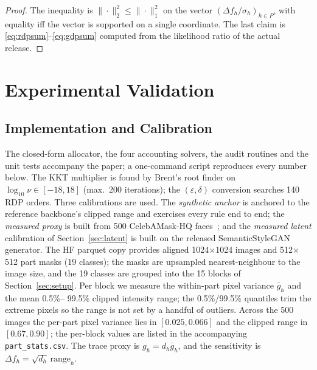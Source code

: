 \documentclass[10pt,twocolumn,letterpaper]{article}
\theoremstyle{plain}
\theoremstyle{definition}
\begin{document}
\begin{proof}
The inequality is $\|\cdot\|_2^2\le\|\cdot\|_1^2$ on the vector
$(\Delta f_h/\sigma_h)_{h\in P}$, with equality iff the vector is supported on
a single coordinate. The last claim is \eqref{eq:rdpsum}--\eqref{eq:gdpsum}
computed from the likelihood ratio of the actual release.
\end{proof}



\section{Experimental Validation}
\label{sec:experiments}

\subsection{Implementation and Calibration}

The closed-form allocator, the four accounting solvers, the audit routines and
the unit tests accompany the paper; a one-command script reproduces every
number below. The KKT multiplier is found by Brent's root finder on $\log_{10}\nu\in[-18,18]$
(max.\ 200 iterations); the $(\varepsilon,\delta)$ conversion searches 140 RDP orders.
Three calibrations are used. The \emph{synthetic anchor} is anchored to the
reference backbone's clipped range and exercises every rule end to end; the
\emph{measured proxy} is built from 500 CelebAMask-HQ faces~\cite{celebamaskhq};
and the \emph{measured latent} calibration of Section~\ref{sec:latent} is built
on the released SemanticStyleGAN generator. The HF parquet
copy provides aligned 1024$\times$1024 images and 512$\times$512 part masks
(19 classes); the masks are upsampled nearest-neighbour to the image size, and
the 19 classes are grouped into the 15 blocks of Section~\ref{sec:setup}. Per
block we measure the within-part pixel variance $\bar g_h$ and the mean 0.5\%--
99.5\% clipped intensity range; the 0.5\%/99.5\% quantiles trim the extreme
pixels so the range is not set by a handful of outliers. Across the 500 images
the per-part pixel variance lies in $[0.025,0.066]$ and the clipped range in
$[0.67,0.90]$; the per-block values are listed in the accompanying
\texttt{part\_stats.csv}. The trace proxy is $g_h=d_h\bar g_h$, and the
sensitivity is $\Delta f_h=\sqrt{d_h}\,\mathrm{range}_h$.
\end{document}
